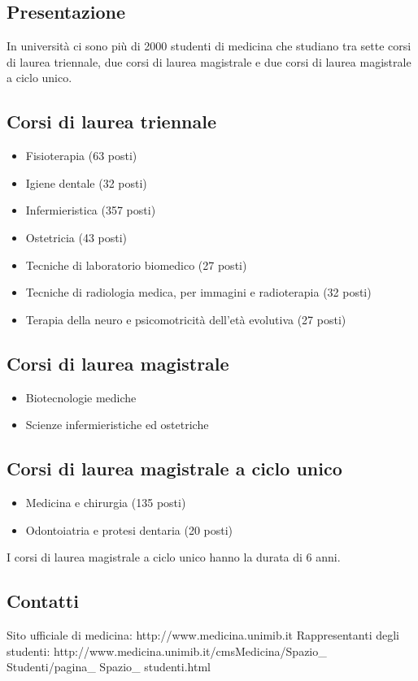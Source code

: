 
\subsection{Presentazione}
In università ci sono più di 2000 studenti di medicina che studiano tra sette corsi di laurea triennale, due corsi di laurea magistrale e due corsi di laurea magistrale a ciclo unico. 

\subsection{Corsi di laurea triennale}
\begin{itemize}
\item Fisioterapia (63 posti) 
\item Igiene dentale (32 posti) 
\item Infermieristica (357 posti) 
\item Ostetricia (43 posti) 
\item Tecniche di laboratorio biomedico (27 posti) 
\item Tecniche di radiologia medica, per immagini e radioterapia (32 posti) 
\item Terapia della neuro e psicomotricità dell'età evolutiva (27 posti) 
\end{itemize}

\subsection{Corsi di laurea magistrale}
\begin{itemize}
\item Biotecnologie mediche 
\item Scienze infermieristiche ed ostetriche
\end{itemize}

\subsection{Corsi di laurea magistrale a ciclo unico}
\begin{itemize}
\item Medicina e chirurgia (135 posti) 
\item Odontoiatria e protesi dentaria (20 posti) 
\end{itemize}
I corsi di laurea magistrale a ciclo unico hanno la durata di 6 anni. 

\subsection{Contatti}
Sito ufficiale di medicina: http://www.medicina.unimib.it 
Rappresentanti degli studenti: http://www.medicina.unimib.it/cmsMedicina/Spazio\_ Studenti/pagina\_ Spazio\_ studenti.html 
